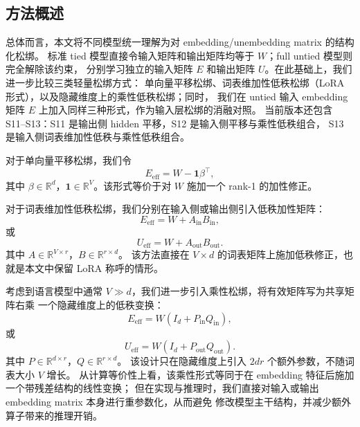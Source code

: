 \subsection{方法概述}

总体而言，本文将不同模型统一理解为对 embedding/unembedding matrix 的结构化松绑。
标准 tied 模型直接令输入矩阵和输出矩阵均等于 $W$；full untied 模型则完全解除该约束，
分别学习独立的输入矩阵 $E$ 和输出矩阵 $U$。在此基础上，我们进一步比较三类轻量松绑方式：
单向量平移松绑、词表维加性低秩松绑（LoRA 形式），以及隐藏维度上的乘性低秩松绑；同时，
我们在 untied 输入 embedding 矩阵 $E$ 上加入同样三种形式，作为输入层松绑的消融对照。
当前版本还包含 S11--S13：S11 是输出侧 hidden 平移，S12 是输入侧平移与乘性低秩组合，
S13 是输入侧词表维加性低秩与乘性低秩组合。

对于单向量平移松绑，我们令
\begin{equation}
    E_{\mathrm{eff}} = W-\mathbf{1}\beta^\top,
\end{equation}
其中 $\beta\in\mathbb{R}^{d}$，$\mathbf{1}\in\mathbb{R}^{V}$。该形式等价于对 $W$
施加一个 rank-1 的加性修正。

对于词表维加性低秩松绑，我们分别在输入侧或输出侧引入低秩加性矩阵：
\begin{equation}
    E_{\mathrm{eff}} = W+A_{\mathrm{in}}B_{\mathrm{in}},
\end{equation}
或
\begin{equation}
    U_{\mathrm{eff}} = W+A_{\mathrm{out}}B_{\mathrm{out}}.
\end{equation}
其中 $A\in\mathbb{R}^{V\times r}$，$B\in\mathbb{R}^{r\times d}$。
该方法直接在 $V\times d$ 的词表矩阵上施加低秩修正，也就是本文中保留 LoRA 称呼的情形。

考虑到语言模型中通常 $V\gg d$，我们进一步引入乘性松绑，将有效矩阵写为共享矩阵右乘
一个隐藏维度上的低秩变换：
\begin{equation}
    E_{\mathrm{eff}} = W(I_d+P_{\mathrm{in}}Q_{\mathrm{in}}),
\end{equation}
或
\begin{equation}
    U_{\mathrm{eff}} = W(I_d+P_{\mathrm{out}}Q_{\mathrm{out}}).
\end{equation}
其中 $P\in\mathbb{R}^{d\times r}$，$Q\in\mathbb{R}^{r\times d}$。
该设计只在隐藏维度上引入 $2dr$ 个额外参数，不随词表大小 $V$ 增长。
从计算等价性上看，该乘性形式等同于在 embedding 特征后施加一个带残差结构的线性变换；
但在实现与推理时，我们直接对输入或输出 embedding matrix 本身进行重参数化，从而避免
修改模型主干结构，并减少额外算子带来的推理开销。

